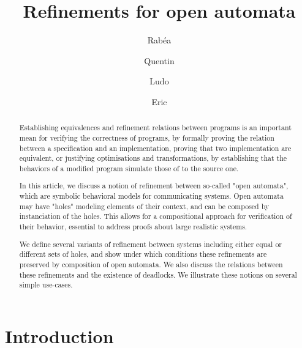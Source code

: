 \documentclass[runningheads]{llncs}
\begin{document}
%
\title{Refinements for open automata}
%
%
\author{
Rabéa \and
Quentin \and
Ludo \and
Eric}
%
%
%
\maketitle              %
%
\begin{abstract}

Establishing equivalences and refinement relations between programs is an important mean for 
verifying the correctness of programs, by formally proving the relation between a specification and an implementation, 
proving that two implementation are equivalent, or justifying optimisations and transformations, by establishing that the
behaviors of a modified program simulate those of to the source one.

In this article, we discuss a notion of refinement between so-called "open automata", which are symbolic
behavioral models for communicating systems. Open automata may have "holes" modeling elements of their
context, and can be composed by instanciation of the holes. This allows for a compositional approach for
verification of their behavior, essential to address proofs about large realistic systems.

We define several variants of refinement between systems including either equal or different sets of holes, and 
show under which conditions these refinements are preserved by composition of open automata. We also discuss
the relations between these refinements and the existence of deadlocks.
We illustrate these notions on several simple use-cases.


\end{abstract}
%
%
%
\section{Introduction}
\end{document}
